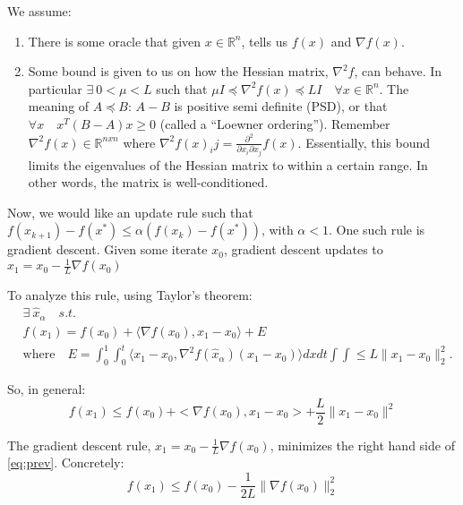 \documentclass[11pt]{article}
\newcommand{\R}{\mathbb{R}}
\begin{document}
We assume:
\begin{enumerate}
    \item There is some oracle that given $x \in \R^n$, tells us $f(x)$ and $\nabla f(x)$.
    \item Some bound is given to us on how the Hessian matrix, $\nabla^2 f$, can behave. In particular $\exists ~ 0 < \mu < L$ such that $\mu I \preceq \nabla^2 f(x) \preceq LI \quad \forall x \in \mathbb{R}^n$. The meaning of $A \preceq B$: $A - B$ is positive semi definite (PSD), or that $\forall x \quad x^T(B-A)x \geq 0$ (called a ``Loewner ordering'').  Remember $\nabla^2 f(x) \in \mathbb{R}^{nxn}$ where $\nabla^2f(x)_ij = \frac{\partial^2}{\partial x_i \partial x_j} f(x)$. Essentially, this bound limits the eigenvalues of the Hessian matrix to within a certain range. In other words, the matrix is well-conditioned.
\end{enumerate}

Now, we would like an update rule such that $f(x_{k+1}) - f(x^*) \leq \alpha (f(x_k) - f(x^*))$, with $\alpha < 1$. One such rule is gradient descent. Given some iterate $x_0$, gradient descent updates to $x_1 = x_0 - \frac{1}{L}\nabla f(x_0)$

To analyze this rule, using Taylor's theorem:
\begin{align}
    &\exists ~ \hat{x}_\alpha \quad s.t.\\
    &f(x_1) = f(x_0) + \langle\nabla f(x_0), x_1 - x_0\rangle + E\\
    &\textrm{where} \quad E = \int_0^1 \int_0^t \langle x_1 - x_0, \nabla^2 f(\hat{x}_{\alpha}) (x_1 - x_0)\rangle dx dt \int\int \leq L \|x_1 - x_0\|^2_2.
    \label{eq:taylor}
\end{align}

So, in general:
\begin{equation}
    f(x_1) \leq f(x_0) + <\nabla f(x_0), x_1 - x_0> + \frac{L}{2} \|x_1 - x_0\|^2
    \label{eq:prev}
\end{equation}

The gradient descent rule, $x_1 = x_0 - \frac{1}{L}\nabla f(x_0)$, minimizes the right hand side of \ref{eq:prev}. Concretely:
\begin{equation}
    f(x_1) \leq f(x_0) - \frac{1}{2L}\|\nabla f(x_0)\|^2_2
    \label{bound1}
\end{equation}
\end{document}
